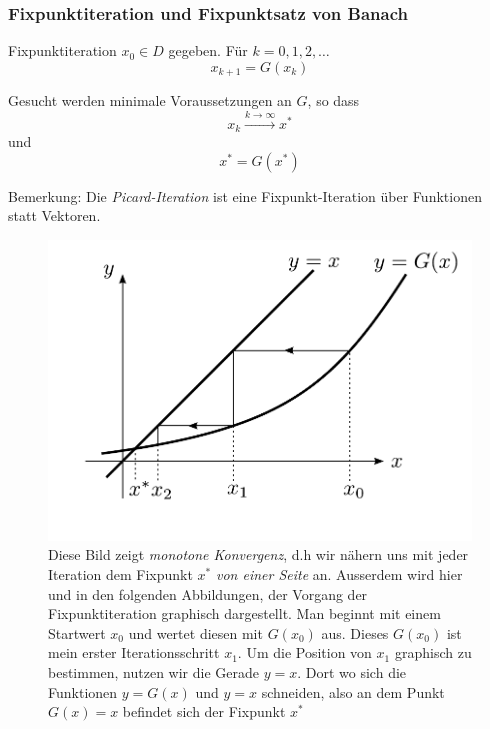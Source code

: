 \documentclass[10pt,a4paper]{article}
\begin{document}
\subsubsection{Fixpunktiteration und Fixpunktsatz von Banach}

Fixpunktiteration $x_0 \in D$ gegeben. Für $k=0,1,2,\ldots$ $$x_{k+1}=G(x_k)$$

Gesucht werden minimale Voraussetzungen an $G$, so dass $$x_k \stackrel{k\rightarrow \infty}{\rightarrow} x^{*}$$ und $$x^{*}=G(x^{*})$$


Bemerkung: Die \emph{Picard-Iteration} ist eine Fixpunkt-Iteration über Funktionen statt Vektoren.

\begin{figure}[H]
\includegraphics[width=\textwidth]{images/monotone_konvergenz}
\caption{Diese Bild zeigt \emph{monotone Konvergenz}, d.h wir nähern uns mit jeder Iteration dem Fixpunkt $x^{*}$ \emph{von einer Seite} an. Ausserdem wird hier und in den folgenden Abbildungen, der Vorgang der Fixpunktiteration graphisch dargestellt. Man beginnt mit einem Startwert $x_0$ und wertet diesen mit $G(x_0)$ aus. Dieses $G(x_0)$ ist mein erster Iterationsschritt $x_1$. Um die Position von $x_1$ graphisch zu bestimmen, nutzen wir die Gerade $y=x$. Dort wo sich die Funktionen $y=G(x)$ und $y=x$ schneiden, also an dem Punkt $G(x)=x$ befindet sich der Fixpunkt $x^{*}$}
\end{figure}
\end{document}
